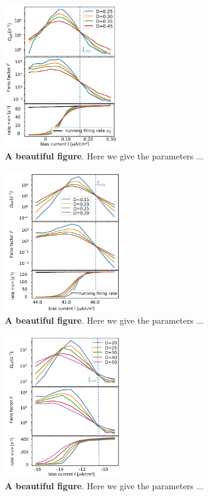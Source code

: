 \documentclass[twocolumn,showpacs,aps,superscriptaddress]{revtex4-1}
\begin{document}
\begin{figure}[h]
\centering
\includegraphics[width=0.45\textwidth]{FIGURES/allsaddlenode_2clip.pdf}
\caption{{\bf A beautiful figure}. Here we give the parameters ...
}
\label{allsaddlenode}
\end{figure}
\begin{figure}[h]
	\centering
	\includegraphics[width=0.45\textwidth]{FIGURES/allanhopf_2clip.pdf}
	\caption{{\bf A beautiful figure}. Here we give the parameters ...
	}
	\label{allanhopf}
\end{figure}
\begin{figure}[h]
	\centering
	\includegraphics[width=0.45\textwidth]{FIGURES/allrinzel_2clip.pdf}
	\caption{{\bf A beautiful figure}. Here we give the parameters ...
	}
	\label{allrinzel}
\end{figure}
\end{document}
